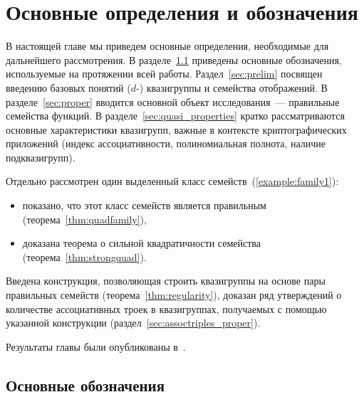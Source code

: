 \chapter{Основные определения и обозначения}\label{sec:intro}

    В настоящей главе мы приведем основные определения, необходимые для дальнейшего рассмотрения.
    В разделе~\ref{sec:notation} приведены основные обозначения, используемые на протяжении всей работы.
    Раздел~\ref{sec:prelim} посвящен введению базовых понятий ($d$-) квазигруппы и семейства отображений.
    В разделе~\ref{sec:proper} вводится основной объект исследования~--- правильные семейства функций.
    В разделе~\ref{sec:quasi_properties} кратко рассматриваются основные характеристики квазигрупп, важные в контексте криптографических приложений (индекс ассоциативности, полиномиальная полнота, наличие подквазигрупп).

    Отдельно рассмотрен один выделенный класс семейств~(\ref{example:family1}):
    \begin{itemize}
        \item показано, что этот класс семейств является правильным (теорема~\ref{thm:quadfamily}), 
        \item доказана теорема о сильной квадратичности семейства (теорема~\ref{thm:strongquad}).
    \end{itemize}

    Введена конструкция, позволяющая строить квазигруппы на основе пары правильных семейств (теорема~\ref{thm:regularity}), доказан ряд утверждений о количестве ассоциативных троек в квазигруппах, получаемых с помощью указанной конструкции (раздел~\ref{sec:assoctriples_proper}).

    Результаты главы были опубликованы в~\cite{dm21, galatenko23, galatenko2023proper, tsar24}.



\section{Основные обозначения}
\label{sec:notation}

